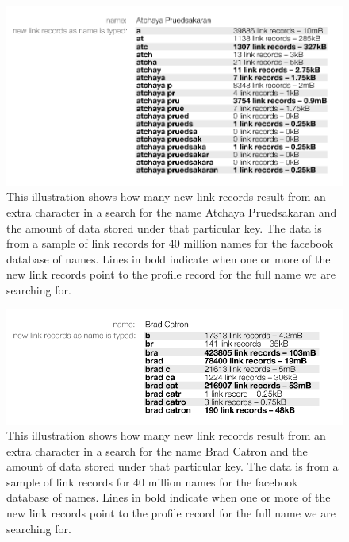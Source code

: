 \begin{figure}[!h]
\begin{center}
	\includegraphics[width=0.9\linewidth]{illustrations/LinkRecordLookups.png}
\caption{This illustration shows how many new link records result from an extra character in a search for the name Atchaya Pruedsakaran and the amount of data stored under that particular key. The data is from a sample of link records for 40 million names for the facebook database of names. Lines in bold indicate when one or more of the new link records point to the profile record for the full name we are searching for.}
\label{figKeyLookup1}
\end{center}
\end{figure}

\begin{figure}[!h]
\begin{center}
	\includegraphics[width=0.9\linewidth]{illustrations/LinkRecordLookups2.png}
\caption{This illustration shows how many new link records result from an extra character in a search for the name Brad Catron and the amount of data stored under that particular key. The data is from a sample of link records for 40 million names for the facebook database of names. Lines in bold indicate when one or more of the new link records point to the profile record for the full name we are searching for.}
\label{figKeyLookup2}
\end{center}
\end{figure}

